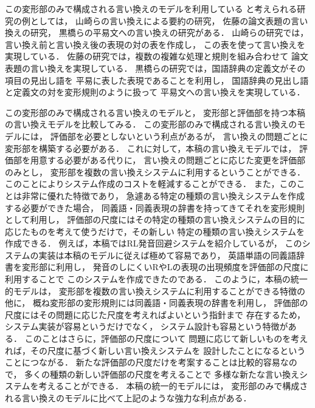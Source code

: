 この変形部のみで構成される言い換えのモデルを利用している
と考えられる研究の例としては，
山崎らの言い換えによる要約の研究\cite{yamasaki_NLP98}，
佐藤の論文表題の言い換えの研究\cite{sato_ronbun_iikae}，
黒橋らの平易文への言い換えの研究\cite{kurohashi_nlp2001ws_true}がある．
山崎らの研究では，言い換え前と言い換え後の表現の対の表を作成し，
この表を使って言い換えを実現している．
佐藤の研究では，複数の複雑な処理と規則を組み合わせて
論文表題の言い換えを実現している．
黒橋らの研究では，国語辞典の定義文がその項目の見出し語を
平易に表した表現であることを利用し，
国語辞典の見出し語と定義文の対を変形規則のように扱って
平易文への言い換えを実現している．

この変形部のみで構成される言い換えのモデルと，
変形部と評価部を持つ本稿の言い換えモデルを比較してみる．
この変形部のみで構成される言い換えのモデルには，
評価部を必要としないという利点があるが，
言い換えの問題ごとに変形部を構築する必要がある．
これに対して，本稿の言い換えモデルでは，
評価部を用意する必要がある代りに，
言い換えの問題ごとに応じた変更を評価部のみとし，
変形部を複数の言い換えシステムに利用するということができる．
このことによりシステム作成のコストを軽減することができる．
また，このことは非常に優れた特徴であり，
急遽ある特定の種類の言い換えシステムを作成する必要ができた場合，
同義語・同義表現の辞書を持ってきてそれを変形規則として利用し，
評価部の尺度にはその特定の種類の言い換えシステムの目的に
応じたものを考えて使うだけで，その新しい
特定の種類の言い換えシステムを作成できる．
例えば，本稿ではRL発音回避システムを紹介しているが，
このシステムの実装は本稿のモデルに従えば極めて容易であり，
英語単語の同義語辞書を変形部に利用し，
発音のしにくいRやLの表現の出現頻度を評価部の尺度に利用することで
このシステムを作成できたのである．
このように，本稿の統一的モデルは，
変形部を複数の言い換えシステムに利用することができる特徴の他に，
概ね変形部の変形規則には同義語・同義表現の辞書を利用し，
評価部の尺度にはその問題に応じた尺度を考えればよいという指針まで
存在するため，システム実装が容易というだけでなく，
システム設計も容易という特徴がある．
このことはさらに，評価部の尺度について
問題に応じて新しいものを考えれば，その尺度に基づく新しい言い換えシステムを
設計したことになるということにつながる．
新たな評価部の尺度だけを考案することは比較的容易なので，
多くの種類の新しい評価部の尺度を考えることで
多様な新たな言い換えシステムを考えることができる．
本稿の統一的モデルには，
変形部のみで構成される言い換えのモデルに比べて上記のような強力な利点がある．

